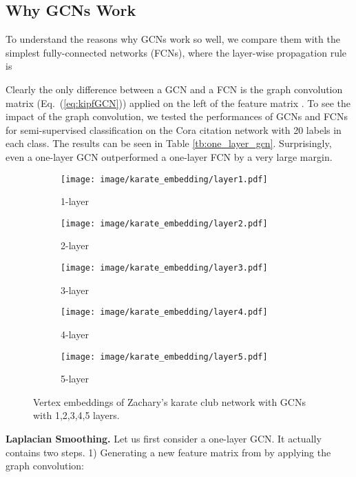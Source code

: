 \documentclass[letterpaper]{article} \usepackage{aaai18}  \usepackage{times}  \usepackage{helvet}  \usepackage{courier}  \usepackage{url}  \usepackage{graphicx}  \usepackage{algorithm}
\begin{document}
\subsection{Why GCNs Work}

To understand the reasons why GCNs work so well, we compare them with the simplest fully-connected  networks (FCNs), where the layer-wise propagation rule is

Clearly the only difference between a GCN and a FCN is the graph convolution matrix  (Eq.~(\ref{eq:kipfGCN})) applied on the left of the feature matrix . To see the impact of the graph convolution, we tested the performances of GCNs and FCNs for semi-supervised classification on the Cora citation network with 20 labels in each class. The results can be seen in Table \ref{tb:one_layer_gcn}. Surprisingly, even a one-layer GCN outperformed a one-layer FCN by a very large margin.


\begin{figure*}[ht!]
\centering
\begin{subfigure}{.2\linewidth}
  \centering
  \texttt{[image: image/karate\_embedding/layer1.pdf]}
  \caption{1-layer}
  \label{fig:sub1}
\end{subfigure}\begin{subfigure}{.2\linewidth}
  \centering
  \texttt{[image: image/karate\_embedding/layer2.pdf]}
  \caption{2-layer}
  \label{fig:sub2}
\end{subfigure}\begin{subfigure}{.2\linewidth}
  \centering
  \texttt{[image: image/karate\_embedding/layer3.pdf]}
  \caption{3-layer}
  \label{fig:sub3}
\end{subfigure}\begin{subfigure}{.2\linewidth}
  \centering
  \texttt{[image: image/karate\_embedding/layer4.pdf]}
  \caption{4-layer}
  \label{fig:sub4}
\end{subfigure}\begin{subfigure}{.2\linewidth}
  \centering
  \texttt{[image: image/karate\_embedding/layer5.pdf]}
  \caption{5-layer}
  \label{fig:sub5}
\end{subfigure}\caption{Vertex embeddings of Zachary's karate club network with GCNs with 1,2,3,4,5 layers.}
\label{fig:karate}
\end{figure*}


\textbf{Laplacian Smoothing.} Let us first consider a one-layer GCN. It actually contains two steps. 1) Generating a new feature matrix  from  by applying the graph convolution:
\end{document}
